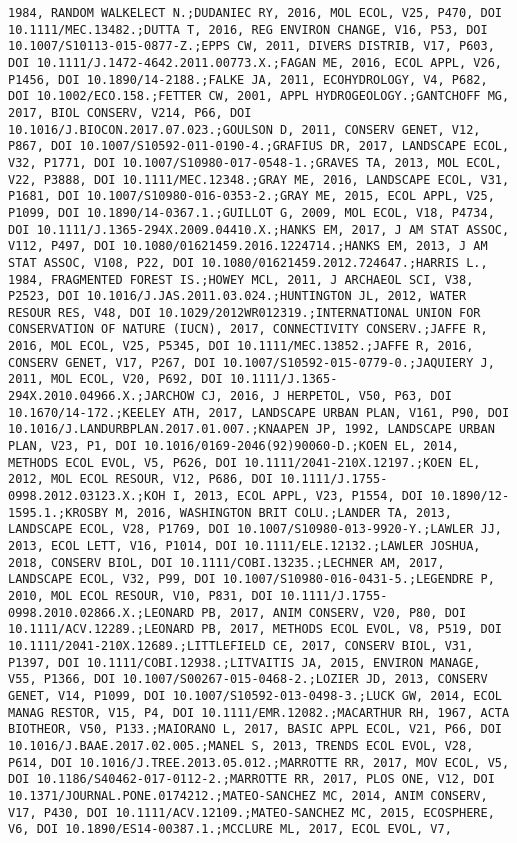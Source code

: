 \documentclass[]{article}
\begin{document}
\begin{verbatim}
1984, RANDOM WALKELECT N.;DUDANIEC RY, 2016, MOL ECOL, V25, P470, DOI 10.1111/MEC.13482.;DUTTA T, 2016, REG ENVIRON CHANGE, V16, P53, DOI 10.1007/S10113-015-0877-Z.;EPPS CW, 2011, DIVERS DISTRIB, V17, P603, DOI 10.1111/J.1472-4642.2011.00773.X.;FAGAN ME, 2016, ECOL APPL, V26, P1456, DOI 10.1890/14-2188.;FALKE JA, 2011, ECOHYDROLOGY, V4, P682, DOI 10.1002/ECO.158.;FETTER CW, 2001, APPL HYDROGEOLOGY.;GANTCHOFF MG, 2017, BIOL CONSERV, V214, P66, DOI 10.1016/J.BIOCON.2017.07.023.;GOULSON D, 2011, CONSERV GENET, V12, P867, DOI 10.1007/S10592-011-0190-4.;GRAFIUS DR, 2017, LANDSCAPE ECOL, V32, P1771, DOI 10.1007/S10980-017-0548-1.;GRAVES TA, 2013, MOL ECOL, V22, P3888, DOI 10.1111/MEC.12348.;GRAY ME, 2016, LANDSCAPE ECOL, V31, P1681, DOI 10.1007/S10980-016-0353-2.;GRAY ME, 2015, ECOL APPL, V25, P1099, DOI 10.1890/14-0367.1.;GUILLOT G, 2009, MOL ECOL, V18, P4734, DOI 10.1111/J.1365-294X.2009.04410.X.;HANKS EM, 2017, J AM STAT ASSOC, V112, P497, DOI 10.1080/01621459.2016.1224714.;HANKS EM, 2013, J AM STAT ASSOC, V108, P22, DOI 10.1080/01621459.2012.724647.;HARRIS L., 1984, FRAGMENTED FOREST IS.;HOWEY MCL, 2011, J ARCHAEOL SCI, V38, P2523, DOI 10.1016/J.JAS.2011.03.024.;HUNTINGTON JL, 2012, WATER RESOUR RES, V48, DOI 10.1029/2012WR012319.;INTERNATIONAL UNION FOR CONSERVATION OF NATURE (IUCN), 2017, CONNECTIVITY CONSERV.;JAFFE R, 2016, MOL ECOL, V25, P5345, DOI 10.1111/MEC.13852.;JAFFE R, 2016, CONSERV GENET, V17, P267, DOI 10.1007/S10592-015-0779-0.;JAQUIERY J, 2011, MOL ECOL, V20, P692, DOI 10.1111/J.1365-294X.2010.04966.X.;JARCHOW CJ, 2016, J HERPETOL, V50, P63, DOI 10.1670/14-172.;KEELEY ATH, 2017, LANDSCAPE URBAN PLAN, V161, P90, DOI 10.1016/J.LANDURBPLAN.2017.01.007.;KNAAPEN JP, 1992, LANDSCAPE URBAN PLAN, V23, P1, DOI 10.1016/0169-2046(92)90060-D.;KOEN EL, 2014, METHODS ECOL EVOL, V5, P626, DOI 10.1111/2041-210X.12197.;KOEN EL, 2012, MOL ECOL RESOUR, V12, P686, DOI 10.1111/J.1755-0998.2012.03123.X.;KOH I, 2013, ECOL APPL, V23, P1554, DOI 10.1890/12-1595.1.;KROSBY M, 2016, WASHINGTON BRIT COLU.;LANDER TA, 2013, LANDSCAPE ECOL, V28, P1769, DOI 10.1007/S10980-013-9920-Y.;LAWLER JJ, 2013, ECOL LETT, V16, P1014, DOI 10.1111/ELE.12132.;LAWLER JOSHUA, 2018, CONSERV BIOL, DOI 10.1111/COBI.13235.;LECHNER AM, 2017, LANDSCAPE ECOL, V32, P99, DOI 10.1007/S10980-016-0431-5.;LEGENDRE P, 2010, MOL ECOL RESOUR, V10, P831, DOI 10.1111/J.1755-0998.2010.02866.X.;LEONARD PB, 2017, ANIM CONSERV, V20, P80, DOI 10.1111/ACV.12289.;LEONARD PB, 2017, METHODS ECOL EVOL, V8, P519, DOI 10.1111/2041-210X.12689.;LITTLEFIELD CE, 2017, CONSERV BIOL, V31, P1397, DOI 10.1111/COBI.12938.;LITVAITIS JA, 2015, ENVIRON MANAGE, V55, P1366, DOI 10.1007/S00267-015-0468-2.;LOZIER JD, 2013, CONSERV GENET, V14, P1099, DOI 10.1007/S10592-013-0498-3.;LUCK GW, 2014, ECOL MANAG RESTOR, V15, P4, DOI 10.1111/EMR.12082.;MACARTHUR RH, 1967, ACTA BIOTHEOR, V50, P133.;MAIORANO L, 2017, BASIC APPL ECOL, V21, P66, DOI 10.1016/J.BAAE.2017.02.005.;MANEL S, 2013, TRENDS ECOL EVOL, V28, P614, DOI 10.1016/J.TREE.2013.05.012.;MARROTTE RR, 2017, MOV ECOL, V5, DOI 10.1186/S40462-017-0112-2.;MARROTTE RR, 2017, PLOS ONE, V12, DOI 10.1371/JOURNAL.PONE.0174212.;MATEO-SANCHEZ MC, 2014, ANIM CONSERV, V17, P430, DOI 10.1111/ACV.12109.;MATEO-SANCHEZ MC, 2015, ECOSPHERE, V6, DOI 10.1890/ES14-00387.1.;MCCLURE ML, 2017, ECOL EVOL, V7, 
\end{verbatim}
\end{document}
